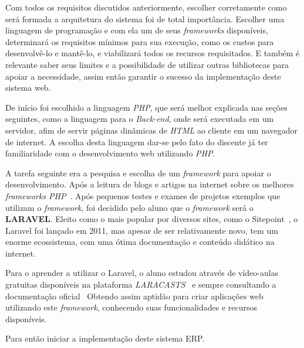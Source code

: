 \documentclass[
  12pt,				%
  openany,
  oneside,
  a4paper,			%
  english,			%
  brazil
]{article}
\numberwithin{figure}{section}
\numberwithin{table}{section}
\begin{document}
Com todos os requisitos discutidos anteriormente, escolher corretamente como será formada a arquitetura do sistema foi de total importância. Escolher uma linguagem de programação e com ela um de seus \textit{frameworks} disponíveis, determinará os requisitos mínimos para sua execução, como os custos para desenvolvê-lo e mantê-lo, e viabilizará todos os recursos requisitados. E também é relevante saber seus limites e a possibilidade de utilizar outras bibliotecas para apoiar a necessidade, assim então garantir o sucesso da implementação deste sistema web.

De início foi escolhido a linguagem \textit{PHP}, que será melhor explicada nas seções seguintes, como a linguagem para o \textit{Back-end}, onde será executada em um servidor, afim de servir páginas dinâmicas de \textit{HTML} ao cliente em um navegador de internet. A escolha desta linguagem dar-se pelo fato do discente já ter familiaridade com o desenvolvimento web utilizando \textit{PHP}.

A tarefa seguinte era a pesquisa e escolha de um \textit{framework} para apoiar o desenvolvimento. Após a leitura de blogs e artigos na internet sobre os melhores \textit{frameworks PHP}~\cite{top10}. Após pequenos testes e exames de projetos exemplos que utilizam o \textit{framework}, foi decidido pelo aluno que o \textit{framework} será o \textbf{LARAVEL}. Eleito como o mais popular por diversos sites, como o Sitepoint~\cite{sitepoint}, o Laravel foi lançado em 2011, mas apesar de ser relativamente novo, tem um enorme ecossistema, com uma ótima documentação e conteúdo didático na internet.

Para o aprender a utilizar o Laravel, o aluno estudou através de vídeo-aulas gratuitas disponíveis na plataforma \textit{LARACASTS}~\cite{laracast} e sempre consultando a documentação oficial~\cite{laraveldocs} Obtendo assim aptidão para criar aplicações web utilizando este \textit{framework}, conhecendo suas funcionalidades e recursos disponíveis.

Para então iniciar a implementação deste sistema ERP.




  
\end{document}
